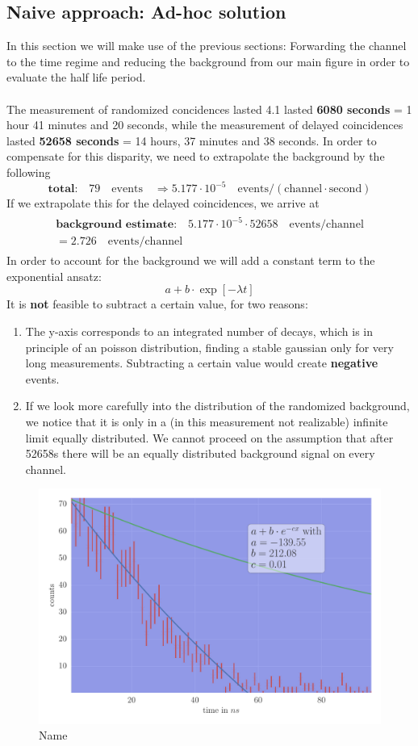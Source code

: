 \subsection{Naive approach: Ad-hoc solution}
In this section we will make use of the previous sections: Forwarding the channel to the time regime and
reducing the background from our main figure in order to evaluate the half life period.\\\\
The measurement of randomized concidences lasted 4.1 lasted \textbf{6080 seconds} = 1 hour 41 minutes and 20 seconds, while
the measurement of delayed coincidences lasted \textbf{52658 seconds} =  14 hours, 37 minutes and 38 seconds. 
In order to compensate for this disparity, we need to extrapolate the background by the following
\begin{equation}
\mathrm{\textbf{total:} } \quad 79 \quad \mathrm{events} \quad \Rightarrow 5.177\cdot 10^{-5}\quad \mathrm{events/ (channel \cdot second)}
\end{equation}
If we extrapolate this for the delayed coincidences, we arrive at
\begin{align}
\begin{split}
\mathrm{\textbf{background estimate:} } \quad  5.177\cdot 10^{-5} \cdot 52658 \quad \mathrm{events / channel} \\
= 2.726\quad \mathrm{events/ channel}
\end{split}
\end{align}
In order to account for the background we will add a constant term to the exponential ansatz: 
\begin{equation}
a + b\cdot \exp \left [ - \lambda t \right ] 
\end{equation}
It is \textbf{not} feasible to subtract a certain value, for two reasons:
\begin{enumerate}
\item The y-axis corresponds to an integrated number of decays, which is in principle of an poisson distribution,
finding a stable gaussian only for very long measurements. Subtracting a certain value would create \textbf{negative}
events. 
\item If we look more carefully into the distribution of the randomized background, we notice that it is only
in a (in this measurement not realizable) infinite limit equally distributed. We cannot proceed on the assumption
that after 52658s there will be an equally distributed background signal on every channel.
\end{enumerate}
\begin{figure}[htpb]
    \centering
    \includegraphics[width=0.8\linewidth]{analysis/figures/plot4_1_reg}
    \caption{Name}
    \label{fig:name}
\end{figure}

